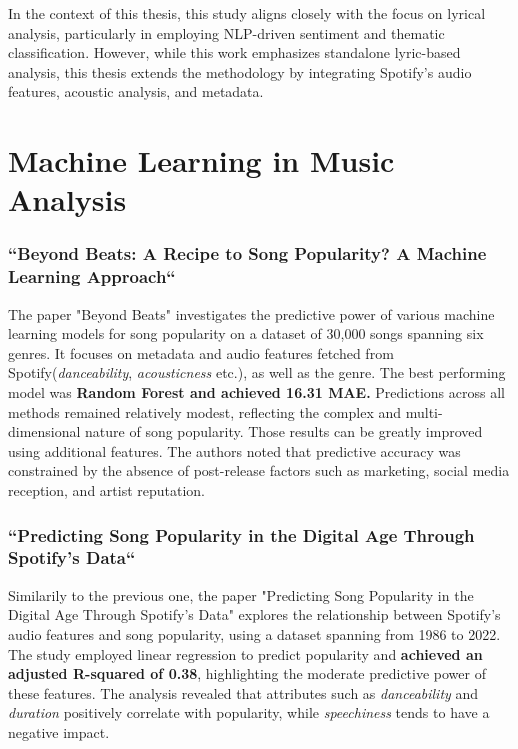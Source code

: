 In the context of this thesis, this study aligns closely with the focus on
lyrical analysis, particularly in employing NLP-driven sentiment and thematic
classification. However, while this work emphasizes standalone lyric-based
analysis, this thesis extends the methodology by integrating Spotify’s audio
features, acoustic analysis, and metadata. 


\section{Machine Learning in Music Analysis}
\label{sec:machinelearningfeaturesinmusicanalysis}

\subsubsection*{``Beyond Beats: A Recipe to Song Popularity? A Machine Learning Approach``}
\cite{beyond_beats}
The paper "Beyond Beats" investigates the predictive power of various machine
learning models for song popularity on a dataset of 30,000 songs spanning six
genres. It focuses on metadata and audio features fetched from
Spotify(\textit{danceability}, \textit{acousticness} etc.), as well as the
genre. The best performing model was \textbf{Random Forest and achieved 16.31 MAE.}
Predictions across all methods remained relatively modest, reflecting the
complex and multi-dimensional  nature of song popularity. Those results can be
greatly improved using additional features. The authors noted that predictive
accuracy was constrained by the absence of post-release factors such as
marketing, social media reception, and artist reputation.


\subsubsection*{``Predicting Song Popularity in the Digital Age Through
Spotify’s Data``} \cite{predicting_song_popularity_2024} Similarily to the previous
one, the paper "Predicting Song Popularity in the Digital Age Through Spotify’s
Data" explores the relationship between Spotify's audio features  and song
popularity, using a dataset spanning from 1986 to 2022. The study employed
linear regression to predict popularity and \textbf{achieved an adjusted
R-squared of 0.38}, highlighting the moderate predictive power of these
features. The analysis revealed that attributes such as \textit{danceability}
and \textit{duration} positively correlate with popularity, while
\textit{speechiness} tends to have a negative impact.
